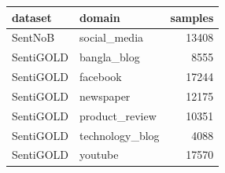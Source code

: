 \begin{tabular}{llr}
\toprule
dataset & domain & samples \\
\midrule
SentNoB & social\_media & 13408 \\
SentiGOLD & bangla\_blog & 8555 \\
SentiGOLD & facebook & 17244 \\
SentiGOLD & newspaper & 12175 \\
SentiGOLD & product\_review & 10351 \\
SentiGOLD & technology\_blog & 4088 \\
SentiGOLD & youtube & 17570 \\
\bottomrule
\end{tabular}
